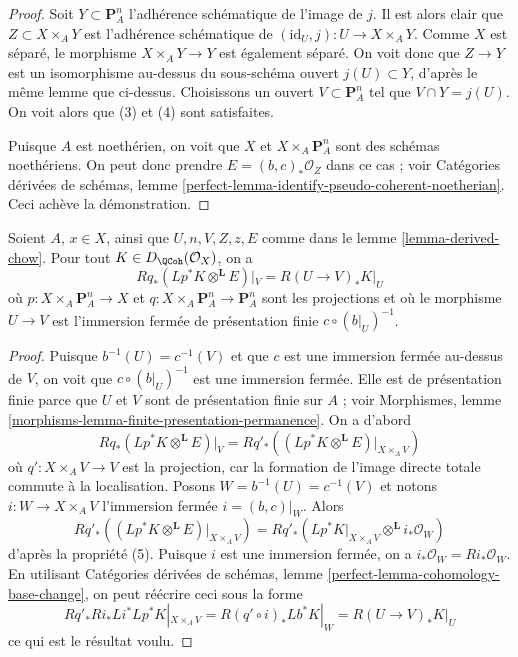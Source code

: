 \begin{proof}
\medskip\noindent
Soit $Y \subset \mathbf{P}^n_A$ l'adhérence schématique
de l'image de $j$. Il est alors clair que $Z \subset X \times_A Y$
est l'adhérence schématique de
$(\text{id}_U, j) : U \to X \times_A Y$.
Comme $X$ est séparé, le morphisme
$X \times_A Y \to Y$ est également séparé.
On voit donc que $Z \to Y$ est un isomorphisme au-dessus du
sous-schéma ouvert $j(U) \subset Y$, d'après le même lemme que ci-dessus.
Choisissons un ouvert $V \subset \mathbf{P}^n_A$ tel que $V \cap Y = j(U)$.
On voit alors que (3) et (4) sont satisfaites.

\medskip\noindent
Puisque $A$ est noethérien, on voit que $X$ et $X \times_A \mathbf{P}^n_A$
sont des schémas noethériens. On peut donc prendre $E = (b, c)_*\mathcal{O}_Z$
dans ce cas ; voir Catégories dérivées de schémas, lemme
\ref{perfect-lemma-identify-pseudo-coherent-noetherian}.
Ceci achève la démonstration.
\end{proof}

\begin{lemma}
\label{lemma-compute-Fourier-Mukai-for-derived-chow}
Soient $A$, $x \in X$, ainsi que
$U, n, V, Z, z, E$ comme dans le lemme \ref{lemma-derived-chow}.
Pour tout $K \in D_\QCoh(\mathcal{O}_X)$, on a
$$
Rq_*(Lp^*K \otimes^\mathbf{L} E)|_V = R(U \to V)_*K|_U
$$
où $p : X \times_A \mathbf{P}^n_A \to X$ et
$q : X \times_A \mathbf{P}^n_A \to \mathbf{P}^n_A$ sont
les projections et où le morphisme $U \to V$ est
l'immersion fermée de présentation finie $c \circ (b|_U)^{-1}$.
\end{lemma}

\begin{proof}
Puisque $b^{-1}(U) = c^{-1}(V)$ et que $c$ est une immersion fermée
au-dessus de $V$, on voit que $c \circ (b|_U)^{-1}$ est une immersion fermée.
Elle est de présentation finie parce que $U$ et $V$ sont de présentation
finie sur $A$ ; voir
Morphismes, lemme \ref{morphisms-lemma-finite-presentation-permanence}.
On a d'abord
$$
Rq_*(Lp^*K \otimes^\mathbf{L} E)|_V =
Rq'_*\left((Lp^*K \otimes^\mathbf{L} E)|_{X \times_A V}\right)
$$
où $q' : X \times_A V \to V$ est la projection, car
la formation de l'image directe totale commute à la localisation.
Posons $W = b^{-1}(U) = c^{-1}(V)$ et notons $i : W \to X \times_A V$
l'immersion fermée $i = (b, c)|_W$. Alors
$$
Rq'_*\left((Lp^*K \otimes^\mathbf{L} E)|_{X \times_A V}\right) =
Rq'_*(Lp^*K|_{X \times_A V} \otimes^\mathbf{L} i_*\mathcal{O}_W)
$$
d'après la propriété (5). Puisque $i$ est une immersion fermée, on a
$i_*\mathcal{O}_W = Ri_*\mathcal{O}_W$.
En utilisant
Catégories dérivées de schémas,
lemme \ref{perfect-lemma-cohomology-base-change},
on peut réécrire ceci sous la forme
$$
Rq'_* Ri_* Li^* Lp^*K|_{X \times_A V} =
R(q' \circ i)_* Lb^*K|_W =
R(U \to V)_* K|_U
$$
ce qui est le résultat voulu.
\end{proof}


